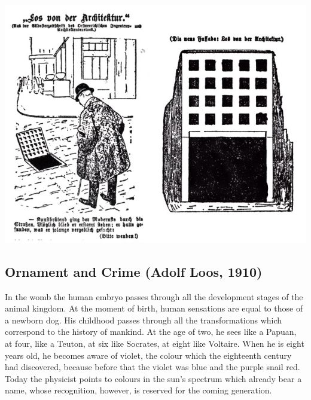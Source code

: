 \documentclass[a4paper]{article}
\begin{document}
\begin{mdframed}[linewidth=1pt, roundcorner=5pt, innerleftmargin=10pt, innerrightmargin=10pt, innertopmargin=10pt, innerbottommargin=10pt, linecolor=black, backgroundcolor=white, userdefinedwidth=\textwidth]
    \centering %
    \includegraphics[width=0.7\linewidth]{./figures/caricature_loos.jpg} %
    \label{fig:caricature_loos}
\end{mdframed}

\subsection{Ornament and Crime (Adolf Loos, 1910)}

In the womb the human embryo passes through all the development stages of the animal kingdom. At the moment of birth, human sensations are equal to those of a newborn dog. His childhood passes through all the transformations which correspond to the history of mankind. At the age of two, he sees like a Papuan, at four, like a Teuton, at six like Socrates, at eight like Voltaire. When he is eight years old, he becomes aware of violet, the colour which the eighteenth century had discovered, because before that the violet was blue and the purple snail red. Today the physicist points to colours in the sun’s spectrum which already bear a name, whose recognition, however, is reserved for the coming generation.
\end{document}
